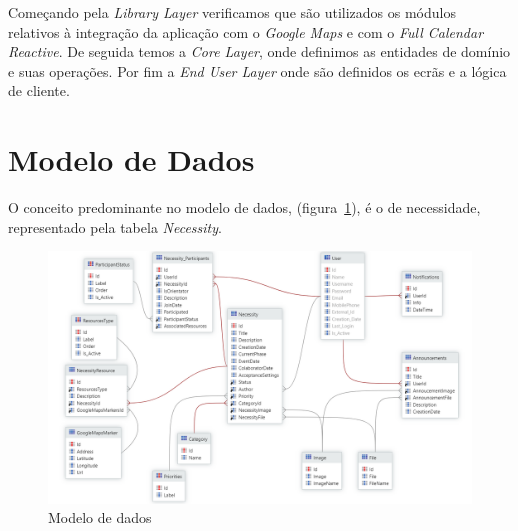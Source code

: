 Começando pela \textit{Library Layer} verificamos que são utilizados os módulos relativos à integração da aplicação 
com o \textit{Google Maps} e com o \textit{Full Calendar Reactive}. De seguida temos a \textit{ Core Layer}, 
onde definimos as entidades de domínio e suas operações. Por fim a \textit{ End User Layer} onde são definidos 
os ecrãs e a lógica de cliente. 

\section{Modelo de Dados}\label{subsec:ModeloDados}

O conceito predominante no modelo de dados, (figura~\ref{fig:modeloDados}), é o de necessidade, representado pela tabela \textit{Necessity}.

\begin{figure}[H]
  \centering 
  \includegraphics[scale=0.4]{figures/DataModel.png}
  \caption{Modelo de dados}\label{fig:modeloDados}
\end{figure}


